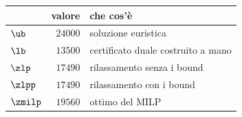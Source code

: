 \begin{center}\small
\begin{tabular}{lrl}
\toprule
 & valore & che cos'è \\
\midrule
$\ub$ & $24000$ & soluzione euristica \\
$\lb$ & $13500$ & certificato duale costruito a mano \\
$\zlp$ & $17490$ & rilassamento senza i bound \\
$\zlpp$ & $17490$ & rilassamento con i bound \\
$\zmilp$ & $19560$ & ottimo del MILP \\
\bottomrule
\end{tabular}
\end{center}
